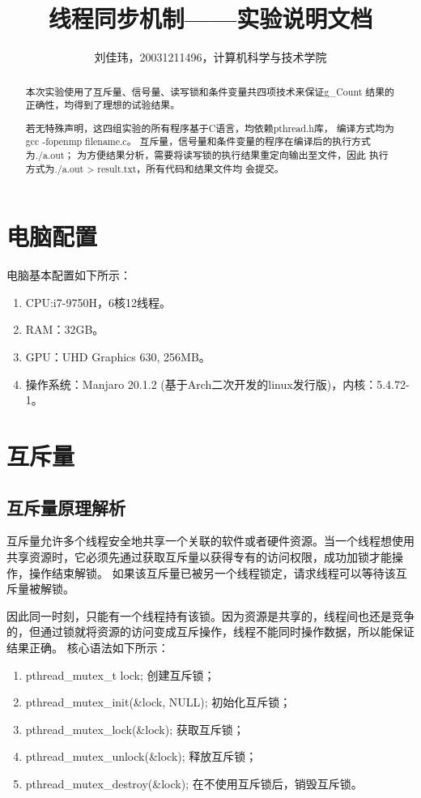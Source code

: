 \documentclass[11pt]{ctexart}
\title{线程同步机制——实验说明文档}
\author{刘佳玮，20031211496，计算机科学与技术学院}
\date{}
\begin{document}
\maketitle

\begin{abstract}
本次实验使用了互斥量、信号量、读写锁和条件变量共四项技术来保证{\ttfamily g\_Count}
结果的正确性，均得到了理想的试验结果。
    
若无特殊声明，这四组实验的所有程序基于C语言，均依赖{\ttfamily pthread.h}库，
编译方式均为{\ttfamily gcc -fopenmp filename.c}。
互斥量，信号量和条件变量的程序在编译后的执行方式为{\ttfamily ./a.out}；
为方便结果分析，需要将读写锁的执行结果重定向输出至文件，因此
执行方式为{\ttfamily ./a.out > result.txt}，所有代码和结果文件均
会提交。
\end{abstract}

\tableofcontents
\newpage

\section{电脑配置}

电脑基本配置如下所示：
\begin{enumerate}[itemsep=-1ex,partopsep=1ex]
    \item CPU:i7-9750H，6核12线程。
    \item RAM：32GB。
    \item GPU：UHD Graphics 630, 256MB。
    \item 操作系统：Manjaro 20.1.2 (基于Arch二次开发的linux发行版)，内核：5.4.72-1。
\end{enumerate}

\section{互斥量}

\subsection{互斥量原理解析}

互斥量允许多个线程安全地共享一个关联的软件或者硬件资源。当一个线程想使用共享资源时，它必须先通过获取互斥量以获得专有的访问权限，成功加锁才能操作，操作结束解锁。
如果该互斥量已被另一个线程锁定，请求线程可以等待该互斥量被解锁。

因此同一时刻，只能有一个线程持有该锁。因为资源是共享的，线程间也还是竞争的，但通过锁就将资源的访问变成互斥操作，线程不能同时操作数据，所以能保证结果正确。
核心语法如下所示：
\begin{enumerate}
    \item {\ttfamily pthread\_mutex\_t lock;} 创建互斥锁；
    \item {\ttfamily pthread\_mutex\_init(\&lock, NULL);} 初始化互斥锁；
    \item {\ttfamily pthread\_mutex\_lock(\&lock);} 获取互斥锁；
    \item {\ttfamily pthread\_mutex\_unlock(\&lock);} 释放互斥锁；
    \item {\ttfamily pthread\_mutex\_destroy(\&lock);} 在不使用互斥锁后，销毁互斥锁。
\end{enumerate}
\end{document}
